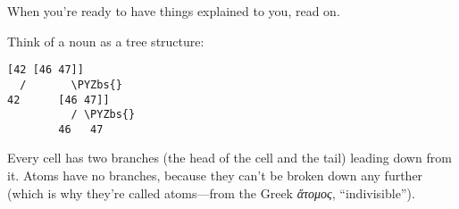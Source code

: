 When you're ready to have things explained to you, read on.

Think of a noun as a tree structure:
\begin{framed_shaded}
\begin{Verbatim}[fontsize=\relsize{-2.5},commandchars=\\\{\}]
  [42 [46 47]]
  /       \PYZbs{}
42      [46 47]]
          / \PYZbs{}
        46   47
\end{Verbatim}
\end{framed_shaded}

Every cell has two branches (the head of the cell and the tail) leading down
from it. Atoms have no branches, because they can't be broken down any further
(which is why they're called atoms---from the Greek \emph{\textgreek{ἄτομος}}, ``indivisible'').

